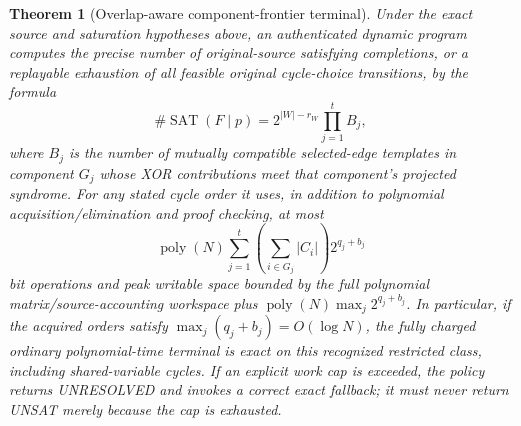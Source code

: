 \documentclass[11pt]{article}
\newtheorem{theorem}{Theorem}
\begin{document}
\begin{theorem}[Overlap-aware component-frontier terminal]\label{thm:dp}
Under the exact source and saturation hypotheses above, an authenticated dynamic program computes the precise number of original-source satisfying completions, or a replayable exhaustion of all feasible original cycle-choice transitions, by the formula
\begin{equation}\label{eq:count}
\boxed{\#\operatorname{SAT}(F\mid p)=2^{|W|-r_W}\prod_{j=1}^{t} B_j,}
\end{equation}
where $B_j$ is the number of mutually compatible selected-edge templates in component $G_j$ whose XOR contributions meet that component's projected syndrome. For any stated cycle order it uses, in addition to polynomial acquisition/elimination and proof checking, at most
\begin{equation}\label{eq:cost}
\operatorname{poly}(N)\sum_{j=1}^{t}\left(\sum_{i\in G_j}|C_i|\right)2^{q_j+b_j}
\end{equation}
bit operations and peak writable space bounded by the full polynomial matrix/source-accounting workspace plus
$\operatorname{poly}(N)\max_j2^{q_j+b_j}$. In particular, if the acquired orders satisfy $\max_j(q_j+b_j)=O(\log N)$, the fully charged \emph{ordinary polynomial-time} terminal is exact on this recognized restricted class, including shared-variable cycles. If an explicit work cap is exceeded, the policy returns UNRESOLVED and invokes a correct exact fallback; it must never return UNSAT merely because the cap is exhausted.
\end{theorem}
\end{document}
